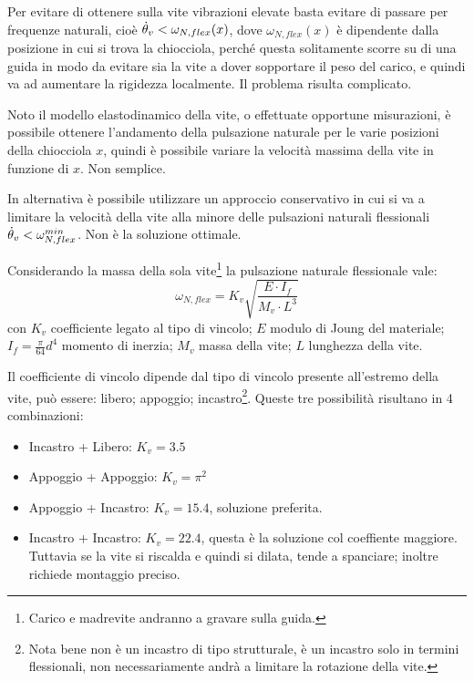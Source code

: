 Per evitare di ottenere sulla vite vibrazioni elevate basta evitare di passare per frequenze naturali, cioè \( \dot{\theta}_v < \omega_{N,flex}(x) \), dove \( \omega_{N,flex}(x) \) è dipendente dalla posizione in cui si trova la chiocciola, perché questa solitamente scorre su di una guida in modo da evitare sia la vite a dover sopportare il peso del carico, e quindi va ad aumentare la rigidezza localmente. Il problema risulta complicato.

Noto il modello elastodinamico della vite, o effettuate opportune misurazioni, è possibile ottenere l'andamento della pulsazione naturale per le varie posizioni della chiocciola \(x\), quindi è possibile variare la  velocità massima della vite in funzione di \(x\). Non semplice.

In alternativa è possibile utilizzare un approccio conservativo in cui si va a limitare la velocità della vite alla minore delle pulsazioni naturali flessionali \( \dot{\theta}_v < \omega_{N,flex}^{min} \). Non è la soluzione ottimale.

Considerando la massa della sola vite\footnote{Carico e madrevite andranno a gravare sulla guida.} la pulsazione naturale flessionale vale:
\[ \omega_{N,flex} = K_v \sqrt{\frac{E \cdot I_f}{M_v \cdot L^3}} \]
con \( K_v \) coefficiente legato al tipo di vincolo; \( E \) modulo di Joung del materiale; \( I_f = \frac{\pi}{64}d^4 \) momento di inerzia; \( M_v \) massa della vite; \( L \) lunghezza della vite.

Il coefficiente di vincolo dipende dal tipo di vincolo presente all'estremo della vite, può essere: libero; appoggio; incastro\footnote{Nota bene non è un incastro di tipo strutturale, è un incastro solo in termini flessionali, non necessariamente andrà a limitare la rotazione della vite.}.
Queste tre possibilità risultano in 4 combinazioni:
\begin{itemize}
    \item Incastro + Libero: \(K_v = 3.5\)
    \item Appoggio + Appoggio: \(K_v = \pi^2\)
    \item Appoggio + Incastro: \(K_v = 15.4\), soluzione preferita.
    \item Incastro + Incastro: \(K_v = 22.4\), questa è la soluzione col coeffiente maggiore. Tuttavia se la vite si riscalda e quindi si dilata, tende a spanciare; inoltre richiede montaggio preciso.
\end{itemize}

